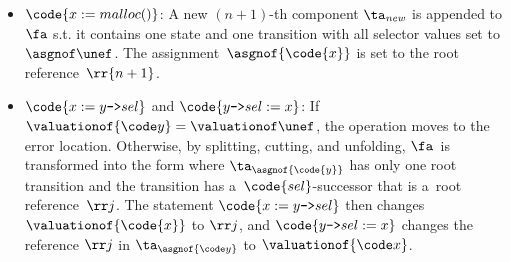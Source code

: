 		\begin{itemize}
		   \item $\code{x := malloc()}$: A new $(n+1)$-th component 
		  $\ta_{\mathit{new}}$ is appended to $\fa$ s.t. it contains one state and one transition with all
		  selector values set to $\asgnof \unef$.
      The assignment~$\asgnof{\code{x}}$ is set to the root reference~$\rr{n+1}$. 

		  \item $\code{x := y\text{\texttt{->}}sel}$ and $\code{y\text{\texttt{->}}sel := x}$:
		If $\valuationof{\code y} = \valuationof\unef$, the operation moves to the error location.
        Otherwise, by splitting, cutting, and unfolding, $\fa$~is transformed into the
        form where $\ta_{\asgnof{\code{y}}}$ has only one root transition and
        the transition has a~$\code{sel}$-successor that is a~root reference~$\rr j$. 
        The statement
$\code{x := y\text{\texttt{->}}sel}$ then changes $\valuationof{\code{x}}$ to $\rr j$, and
$\code{y\text{\texttt{->}}sel := x}$ changes the reference $\rr j$ in $\ta_{\asgnof{\code y}}$ to $\valuationof{\code x}$.




\end{itemize}
